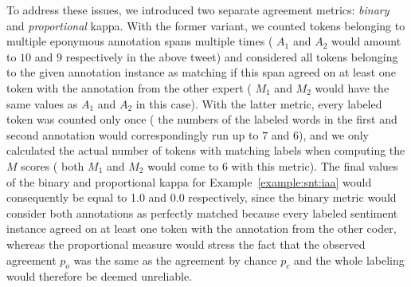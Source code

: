 To address these issues, we introduced two separate agreement metrics:
\emph{binary} and \emph{proportional} kappa.  With the former variant,
we counted tokens belonging to multiple eponymous annotation spans
multiple times (\ie{} $A_1$ and $A_2$ would amount to $10$ and $9$
respectively in the above tweet) and considered all tokens belonging
to the given annotation instance as matching if this span agreed on at
least one token with the annotation from the other expert (\ie{} $M_1$
and $M_2$ would have the same values as $A_1$ and $A_2$ in this case).
With the latter metric, every labeled token was counted only once
(\ie{} the numbers of the labeled words in the first and second
annotation would correspondingly run up to $7$ and $6$), and we only
calculated the actual number of tokens with matching labels when
computing the $M$ scores (\ie{} both $M_1$ and $M_2$ would come to $6$
with this metric).  The final values of the binary and proportional
kappa for Example~\ref{example:snt:iaa} would consequently be equal to
1.0 and 0.0 respectively, since the binary metric would consider both
annotations as perfectly matched because every labeled sentiment
instance agreed on at least one token with the annotation from the
other coder, whereas the proportional measure would stress the fact
that the observed agreement $p_o$ was the same as the agreement by
chance $p_c$ and the whole labeling would therefore be deemed
unreliable.

